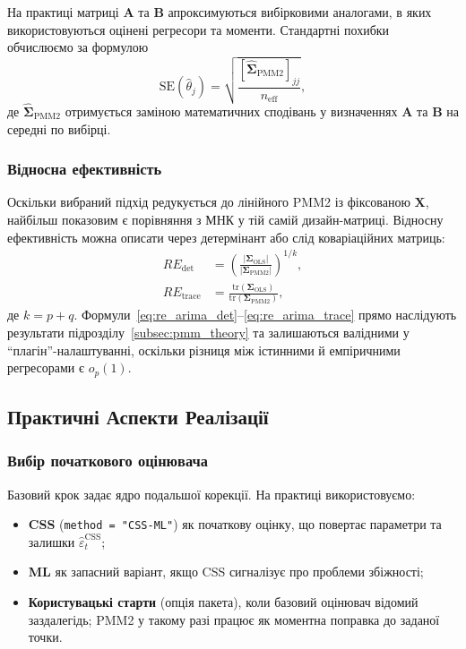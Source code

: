 \documentclass[12pt,a4paper]{article}
\begin{document}
На практиці матриці $\mathbf{A}$ та $\mathbf{B}$ апроксимуються вибірковими аналогами, в яких використовуються оцінені регресори та моменти. Стандартні похибки обчислюємо за формулою
\begin{equation}
\label{eq:standard_errors}
\text{SE}(\hat{\theta}_j) = \sqrt{\frac{[\hat{\boldsymbol{\Sigma}}_{\text{PMM2}}]_{jj}}{n_\text{eff}}},
\end{equation}
де $\hat{\boldsymbol{\Sigma}}_{\text{PMM2}}$ отримується заміною математичних сподівань у визначеннях $\mathbf{A}$ та $\mathbf{B}$ на середні по вибірці.

\subsubsection{Відносна ефективність}

Оскільки вибраний підхід редукується до лінійного PMM2 із фіксованою $\mathbf{X}$, найбільш показовим є порівняння з МНК у тій самій дизайн-матриці. Відносну ефективність можна описати через детермінант або слід коваріаційних матриць:
\begin{align}
\label{eq:re_arima_det}
RE_{\text{det}} &= \left(\frac{|\boldsymbol{\Sigma}_{\text{OLS}}|}{|\boldsymbol{\Sigma}_{\text{PMM2}}|}\right)^{1/k},\\
\label{eq:re_arima_trace}
RE_{\text{trace}} &= \frac{\text{tr}(\boldsymbol{\Sigma}_{\text{OLS}})}{\text{tr}(\boldsymbol{\Sigma}_{\text{PMM2}})},
\end{align}
де $k=p+q$. Формули~\eqref{eq:re_arima_det}--\eqref{eq:re_arima_trace} прямо наслідують результати підрозділу~\ref{subsec:pmm_theory} та залишаються валідними у ``плагін''-налаштуванні, оскільки різниця між істинними й емпіричними регресорами є $o_p(1)$.

\subsection{Практичні Аспекти Реалізації}
\label{subsec:implementation}

\subsubsection{Вибір початкового оцінювача}

Базовий крок задає ядро подальшої корекції. На практиці використовуємо:
\begin{itemize}
    \item \textbf{CSS} (\texttt{method = "CSS-ML"}) як початкову оцінку, що повертає параметри та залишки $\widehat{\varepsilon}_t^{\text{CSS}}$;
    \item \textbf{ML} як запасний варіант, якщо CSS сигналізує про проблеми збіжності;
    \item \textbf{Користувацькі старти} (опція пакета), коли базовий оцінювач відомий заздалегідь; PMM2 у такому разі працює як моментна поправка до заданої точки.
\end{itemize}
\end{document}
